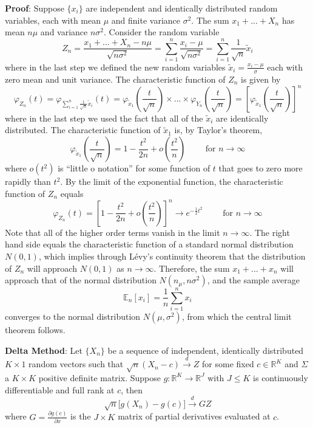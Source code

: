 \documentclass[12pt,]{book}
\begin{document}
\textbf{Proof}:
Suppose \(\{ x_i \}\) are independent and identically distributed random variables, each with mean \(\mu\) and finite variance \(\sigma^2\). The sum \(x_1 + ... + X_n\) has mean \(n\mu\) and variance \(n\sigma^2\). Consider the random variable
\[
    Z_n = \frac{x_1 + ... + X_n - n\mu}{\sqrt{n \sigma^2}} = \sum _ {i=1}^n \frac{x_i - \mu}{\sqrt{n \sigma^2}} = \sum _ {i=1}^n \frac{1}{\sqrt{n}} \tilde x_i
\]
where in the last step we defined the new random variables \(\tilde x _i = \frac{x_i - \mu}{\sigma}\) each with zero mean and unit variance. The characteristic function of \(Z_n\) is given by
\[
    \varphi _ {Z_n}(t) = \varphi _ { \sum _ {i=1}^n \frac{1}{\sqrt{n}} \tilde x_i}(t) = \varphi _ {\tilde x_1} \left( \frac{t}{\sqrt{n}} \right) \times ... \times \varphi _ {Y_n} \left( \frac{t}{\sqrt{n}} \right) = \left[ \varphi _ {\tilde x_1} \left( \frac{t}{\sqrt{n}} \right) \right]^n
\]
where in the last step we used the fact that all of the \(\tilde x _i\) are identically distributed. The characteristic function of \(\tilde x _1\) is, by Taylor's theorem,
\[
    \varphi _ {\tilde x_1} \left( \frac{t}{\sqrt{n}} \right) = 1 - \frac{t^2}{2n} + o\left(\frac{t^2}{n}\right) \qquad \text{ for } n \to \infty
\]
where \(o(t^2)\) is ``little o notation'' for some function of \(t\) that goes to zero more rapidly than \(t^2\). By the limit of the exponential function, the characteristic function of \(Z_n\) equals
\[
    \varphi _ {Z_ n}(t) = \left[  1 - \frac{t^2}{2n} + o \left( \frac{t^2}{n} \right) \right]^n \to e^{ -\frac{1}{2}t^2 } \qquad \text{ for } n \to \infty
\]
Note that all of the higher order terms vanish in the limit \(n \to \infty\). The right hand side equals the characteristic function of a standard normal distribution \(N(0,1)\), which implies through Lévy's continuity theorem that the distribution of \(Z_ n\) will approach \(N(0,1)\) as \(n \to \infty\). Therefore, the sum \(x_ 1 + ... + x_ n\) will approach that of the normal distribution \(N(n_ \mu, n\sigma^2)\), and the sample average
\[
    \mathbb{E}_n [x_i] = \frac{1}{n} \sum _ {i=1}^n x_i
\]
converges to the normal distribution \(N(\mu, \sigma^2)\), from which the central limit theorem follows.
\[\tag*{$\blacksquare$}\]

\textbf{Delta Method}:
Let \(\{ X_n \}\) be a sequence of independent, identically distributed \(K \times 1\) random vectors such that \(\sqrt{n} (X_n - c) \overset{d}{\to} Z\) for some fixed \(c \in \mathbb{R}^K\) and \(\Sigma\) a \(K \times K\) positive definite matrix. Suppose \(g : \mathbb{R}^K \to \mathbb{R}^J\) with \(J \leq K\) is continuously differentiable and full rank at \(c\), then
\[
    \sqrt{n} \Big[ g(X_n) - g( c ) \Big] \overset{d}{\to} G Z
\]
where \(G = \frac{\partial g( c )}{\partial x}\) is the \(J \times K\) matrix of partial derivatives evaluated at \(c\).
\end{document}
